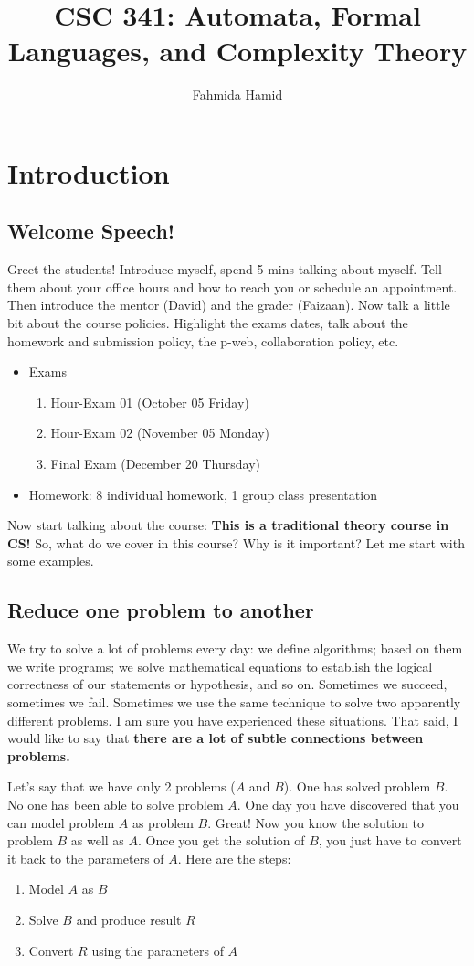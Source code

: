 \documentclass[11pt, oneside]{article}   	%
\title{CSC 341: Automata, Formal Languages, and Complexity Theory}
\author{Fahmida Hamid}
\begin{document}
\maketitle
\section{Introduction}
\subsection{Welcome Speech!}
Greet the students!
Introduce myself, spend 5 mins talking about myself. Tell them about your office hours and how to reach you or schedule an appointment. Then introduce the mentor (David) and the grader (Faizaan). Now talk a little bit about the course policies. Highlight the exams dates, talk about the homework and submission policy, the p-web, collaboration policy, etc.
\begin{itemize}
\item Exams
\begin{enumerate}
\item Hour-Exam 01 (October 05 Friday)
\item Hour-Exam 02 (November 05 Monday)
\item Final Exam (December 20 Thursday)
\end{enumerate}
\item Homework: 8 individual homework, 1 group class presentation
\end{itemize}
Now start talking about the course: {\bf This is a traditional theory course in CS!} So, what do we cover in this course? Why is it important? Let me start with some examples. 

\subsection{Reduce one problem to another}
We try to solve a lot of problems every day: we define algorithms; based on them we write programs; we solve mathematical equations to establish the logical correctness of our statements or hypothesis, and so on. Sometimes we succeed, sometimes we fail. Sometimes we use the same technique to solve two apparently different problems. I am sure you have experienced these situations. That said, I would like to say that {\bf there are a lot of subtle connections between problems.} 
\par Let's say that we have only 2 problems ($A$ and $B$). One has solved problem $B$. No one has been able to solve problem $A$. One day you have discovered that you can model problem $A$ as problem $B$. Great! Now you know the solution to problem $B$ as well as $A$. Once you get the solution of $B$, you just have to convert it back to the parameters of $A$. 
Here are the steps:
\begin{enumerate}
\item Model $A$ as $B$
\item Solve $B$ and produce result $R$
\item Convert $R$ using the parameters of $A$
\end{enumerate}
\end{document}
